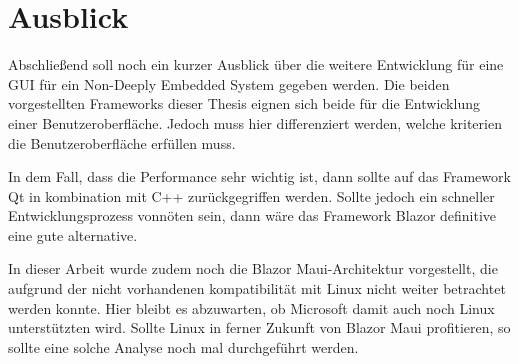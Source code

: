 \chapter{Ausblick}
\label{chp:ausblick}
Abschließend soll noch ein kurzer Ausblick über die weitere Entwicklung für eine GUI für ein
Non-Deeply Embedded System gegeben werden. Die beiden vorgestellten Frameworks dieser Thesis
eignen sich beide für die Entwicklung einer Benutzeroberfläche. Jedoch muss hier differenziert
werden, welche kriterien die Benutzeroberfläche erfüllen muss.

In dem Fall, dass die Performance sehr wichtig ist, dann sollte auf das Framework Qt in
kombination mit C++ zurückgegriffen werden. Sollte jedoch ein schneller Entwicklungsprozess
vonnöten sein, dann wäre das Framework Blazor definitive eine gute alternative.

In dieser Arbeit wurde zudem noch die Blazor Maui-Architektur vorgestellt, die aufgrund der nicht
vorhandenen kompatibilität mit Linux nicht weiter betrachtet werden konnte. Hier bleibt es
abzuwarten, ob Microsoft damit auch noch Linux unterstützten wird. Sollte Linux in ferner Zukunft
von Blazor Maui profitieren, so sollte eine solche Analyse noch mal durchgeführt werden.